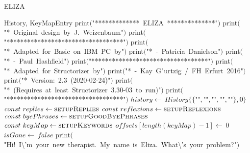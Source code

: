 \documentclass[a4paper,10pt]{article}
\begin{document}
\begin{algorithm}
\caption{ELIZA}
\begin{algorithmic}[5]
\State {}
\State {}
\State {}
\State {}
\State {}
\State {}
\State {}
\State {}
\State {}
\State {}
\State {}
    \State History, KeyMapEntry
  \EndDecl
  \State \(\)print\((\)"{}*************\ ELIZA\ **************"{}\()\)
  \State \(\)print\((\)"{}*\ Original\ design\ by\ J.\ Weizenbaum"{}\()\)
  \State \(\)print\((\)"{}**********************************"{}\()\)
  \State \(\)print\((\)"{}*\ Adapted\ for\ Basic\ on\ IBM\ PC\ by"{}\()\)
  \State \(\)print\((\)"{}*\ -\ Patricia\ Danielson"{}\()\)
  \State \(\)print\((\)"{}*\ -\ Paul\ Hashfield"{}\()\)
  \State \(\)print\((\)"{}**********************************"{}\()\)
  \State \(\)print\((\)"{}*\ Adapted\ for\ Structorizer\ by"{}\()\)
  \State \(\)print\((\)"{}*\ -\ Kay\ G"urtzig\ /\ FH\ Erfurt\ 2016"{}\()\)
  \State \(\)print\((\)"{}*\ Version:\ 2.3\ (2020-02-24)"{}\()\)
  \State \(\)print\((\)"{}*\ (Requires\ at\ least\ Structorizer\ 3.30-03\ to\ run)"{}\()\)
  \State \(\)print\((\)"{}**********************************"{}\()\)
  \State {}
  \State {}
  \State \(history\gets\ History\{\{\)"{}"{}\(,\)"{}"{}\(,\)"{}"{}\(,\)"{}"{}\(,\)"{}"{}\(\},0\}\)
  \State \(const\ replies\gets\Call{setupReplies}{}\)
  \State \(const\ reflexions\gets\Call{setupReflexions}{}\)
  \State \(const\ byePhrases\gets\Call{setupGoodByePhrases}{}\)
  \State \(const\ keyMap\gets\Call{setupKeywords}{}\)
  \State \(offsets[length(keyMap)-1]\gets\ 0\)
  \State \(isGone\gets\ false\)
  \State \(\)print\((\)"{}Hi!\ I\textbackslash{}'{}m\ your\ new\ therapist.\ My\ name\ is\ Eliza.\ What\textbackslash{}'{}s\ your\ problem?"{}\()\)

\end{algorithmic}
\end{algorithm}
\end{document}
